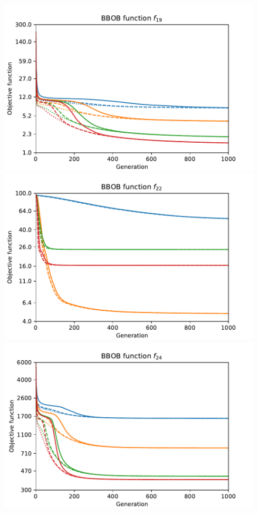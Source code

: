 \begin{figure}[ht!]
    \begin{minipage}[t]{0.32\textwidth}
        \centering
        \includegraphics[width=\textwidth]{img/runs/fitness_pso2006_f19.pdf}
    \end{minipage}
    \hfill
    \begin{minipage}[t]{0.32\textwidth}
        \centering
        \includegraphics[width=\textwidth]{img/runs/fitness_pso2006_f22.pdf}
    \end{minipage}
    \hfill
    \begin{minipage}[t]{0.32\textwidth}
        \centering
        \includegraphics[width=\textwidth]{img/runs/fitness_pso2006_f24.pdf}
    \end{minipage}


\end{figure}
